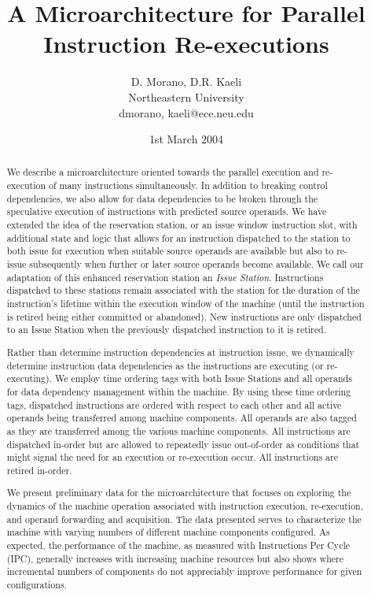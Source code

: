 \documentclass[10pt,dvips]{article}
\begin{document}
%
%
%
\title{A Microarchitecture for Parallel Instruction Re-executions}
%
%
\author{
D. Morano, D.R. Kaeli\\
Northeastern University\\
{dmorano, kaeli}@ece.neu.edu
}
%
%
\date{1st March 2004}
%
\maketitle
%
%
%
\begin{abstract}
%
We describe a microarchitecture oriented towards
the parallel execution and re-execution of many instructions
simultaneously.
In addition to breaking control dependencies, we also allow
for data dependencies to be broken through the speculative
execution of instructions with predicted source operands.
We have extended the idea of the reservation station, or an
issue window instruction slot, with additional state and logic that
allows for an instruction dispatched to the station to both
issue for execution when suitable source operands are available
but also to re-issue subsequently when further or later source
operands become available.  We call our adaptation of
this enhanced reservation station an \textit{Issue Station}.
Instructions dispatched to these stations remain associated
with the station for the duration of the instruction's lifetime
within the execution window of the machine (until the instruction
is retired being either committed or abandoned).
New instructions are only dispatched to an Issue Station when the
previously dispatched instruction to it is retired.

Rather than determine instruction dependencies at 
instruction issue, we dynamically determine instruction data
dependencies as the instructions are executing (or re-executing).
We employ time ordering tags with both Issue Stations and
all operands for data dependency management within the machine.
By using these time ordering tags, dispatched instructions
are ordered with respect to each other and all active operands
being transferred among machine components.  All operands
are also tagged as they are transferred among the various machine 
components.  All instructions are dispatched in-order but are
allowed to repeatedly issue out-of-order as conditions that
might signal the need for an execution or re-execution occur.
All instructions are retired in-order.

We present preliminary data for the microarchitecture that
focuses on exploring the dynamics of the machine
operation associated with instruction execution, re-execution,
and operand forwarding and acquisition.
The data presented serves to characterize the machine
with varying numbers of different machine components configured.
As expected, the performance of the machine, as measured with
Instructions Per Cycle (IPC), generally increases with increasing
machine resources but also shows where incremental numbers of
components do not appreciably improve performance for given 
configurations.
%
\end{abstract}
%
%
\end{document}
